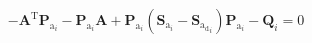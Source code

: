 \documentclass[3p]{elsarticle}
\begin{document}
\begin{equation}
    -\mathbf{A}^\mathrm{T}\mathbf{P}_{\mathrm{a}_{i}} - \mathbf{P}_{\mathrm{a}_{i}}\mathbf{A} + \mathbf{P}_{\mathrm{a}_{i}}(\mathbf{S}_{\mathrm{a}_i} - \mathbf{S}_{\mathrm{a_d}_i}) \mathbf{P}_{\mathrm{a}_{i}} - \mathbf{Q}_{i} = 0 
\end{equation}









\end{document}
